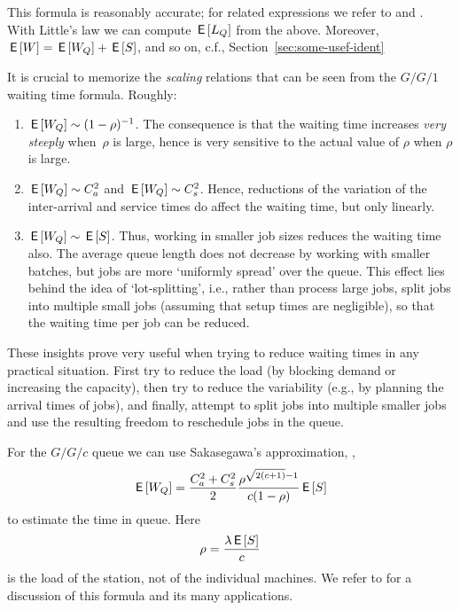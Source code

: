 This formula is reasonably accurate; for related expressions we refer
to \citet{bolch06:_queuein_networ_markov_chain} and
\citet{hall91:_queuein_method_servic_manuf}. With Little's law we can
compute $\,\mathsf{E}\left[L_Q\right]$ from the above. Moreover, $\,\mathsf{E}\left[W\right] = \,\mathsf{E}\left[W_Q\right] + \,\mathsf{E}\left[S\right]$,
and so on, c.f., Section~\ref{sec:some-usef-ident}



It is crucial to memorize the \emph{scaling} relations that can be
seen from the $G/G/1$ waiting time formula. Roughly:
\begin{enumerate}
\item $\,\mathsf{E}\left[W_Q\right] \sim (1-\rho)^{-1}$. The consequence is that the waiting
  time increases \emph{very steeply} when~$\rho$ is large, hence is
  very sensitive to the actual value of $\rho$ when $\rho$ is large.
\item $\,\mathsf{E}\left[W_Q\right] \sim C_a^2$ and $\,\mathsf{E}\left[W_Q\right] \sim C_s^2$. Hence, reductions
  of the variation of the inter-arrival and service times do affect the
  waiting time, but only linearly.
\item $\,\mathsf{E}\left[W_Q\right] \sim \,\mathsf{E}\left[S\right]$. Thus, working in smaller job sizes reduces
  the waiting time also. The average queue length does not decrease by
  working with smaller batches, but jobs are more `uniformly spread'
  over the queue. This effect lies behind the idea of
  `lot-splitting', i.e., rather than process large jobs, split jobs
  into multiple small jobs (assuming that setup times are negligible),
  so that the waiting time per job can be reduced.
\end{enumerate}

These insights prove very useful when trying to reduce waiting times
in any practical situation. First try to reduce the load (by blocking
demand or increasing the capacity), then try to reduce the variability
(e.g., by planning the arrival times of jobs), and finally, attempt to
split jobs into multiple smaller jobs and use the resulting freedom to
reschedule jobs in the queue.

For the $G/G/c$ queue we can use Sakasegawa's approximation, \cite{sakasegawa77:_l}, 
\begin{equation}\label{eq:7}
  \,\mathsf{E}\left[W_Q\right] = \frac{C_a^2+C_s^2}2 \frac{\rho^{\sqrt{2(c+1)}-1}}{c(1-\rho)} \,\mathsf{E}\left[S\right]
\end{equation}
to estimate the time in queue.  Here
\begin{equation*}
  \rho = \frac{\lambda \,\mathsf{E}\left[S\right]}{c}
\end{equation*}
is the load of the station, not of the individual machines. We refer to \cite{hopp08:_factor_physic} for a discussion of this formula and its many applications.


